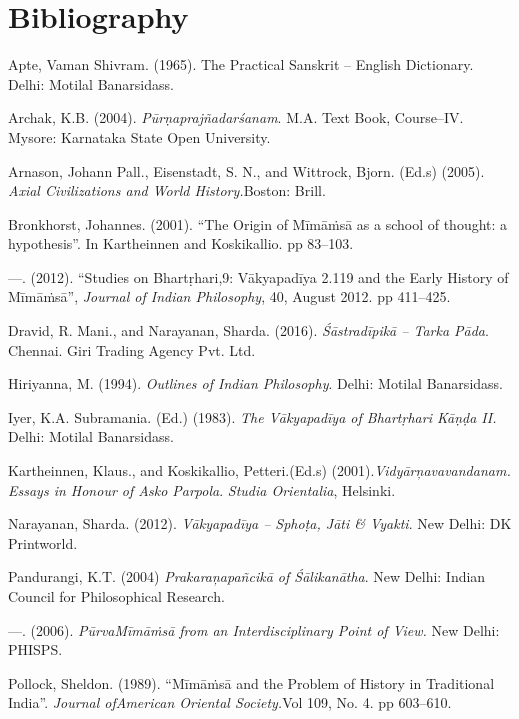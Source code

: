 \section*{Bibliography}

\begin{thebibliography}{99}
\itemsep=1pt
 Apte, Vaman Shivram. (1965). The Practical Sanskrit – English Dictionary. Delhi: Motilal Banarsidass.

  Archak, K.B. (2004). \textit{Pūrṇaprajñadarśanam}. M.A. Text Book, Course–IV. Mysore: Karnataka State Open University.

  Arnason, Johann Pall., Eisenstadt, S. N., and Wittrock, Bjorn. (Ed.s) (2005). \textit{Axial Civilizations and World History.}Boston: Brill.

  Bronkhorst, Johannes. (2001). “The Origin of Mīmāṁsā as a school of thought: a hypothesis”. In Kartheinnen and Koskikallio. pp 83–103.

  —. (2012). “Studies on Bhartṛhari,9: Vākyapadīya 2.119 and the Early History of Mīmāṁsā”, \textit{Journal of Indian Philosophy}, 40, August 2012. pp 411–425.

  Dravid, R. Mani., and Narayanan, Sharda. (2016). \textit{Śāstradīpikā – Tarka Pāda}. Chennai. Giri Trading Agency Pvt. Ltd. 

  Hiriyanna, M. (1994). \textit{Outlines of Indian Philosophy}. Delhi: Motilal Banarsidass. 

  Iyer, K.A. Subramania. (Ed.) (1983). \textit{The Vākyapadīya of Bhartṛhari Kāṇḍa II.} Delhi: Motilal Banarsidass.

  Kartheinnen, Klaus., and Koskikallio, Petteri.(Ed.s) (2001).\textit{Vidyārņavavandanam. Essays in Honour of Asko Parpola}. \textit{Studia Orientalia}, Helsinki.

  Narayanan, Sharda. (2012). \textit{Vākyapadīya – Sphoṭa, Jāti \& Vyakti}. New Delhi: DK Printworld. 

  Pandurangi, K.T. (2004) \textit{Prakaraņapañcikā of Śālikanātha}. New Delhi: Indian Council for Philosophical Research.

  —. (2006). \textit{PūrvaMīmāṁsā from an Interdisciplinary Point of View.} New Delhi: PHISPS. 

  Pollock, Sheldon. (1989). “Mīmāṁsā and the Problem of History in Traditional India”. \textit{Journal ofAmerican Oriental Society.}Vol 109, No. 4. pp 603–610.


\end{thebibliography}
